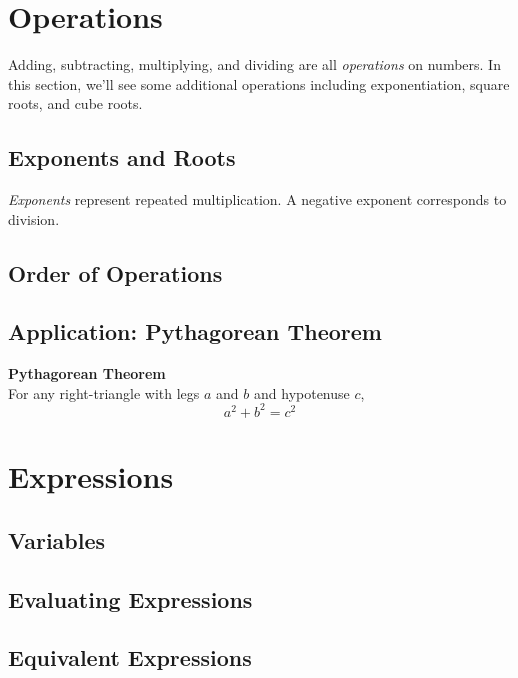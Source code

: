 \newpage 
\section{Operations}

Adding, subtracting, multiplying, and dividing are all \emph{operations} on numbers.  In this section, we'll see some additional operations including exponentiation, square roots, and cube roots.  

\subsection{Exponents and Roots} 
\emph{Exponents} represent repeated multiplication.  
A negative exponent corresponds to division.  



\newpage 
\subsection{Order of Operations}


\newpage 
\subsection{Application: Pythagorean Theorem} 

\begin{theorem} \textbf{Pythagorean Theorem} \\ 
For any right-triangle with legs \(a\) and \(b\) and hypotenuse \(c\),
\[a^2 + b^2 = c^2\]
\end{theorem}


\newpage 
\section{Expressions}

\subsection{Variables}
\subsection{Evaluating Expressions}
\subsection{Equivalent Expressions}
